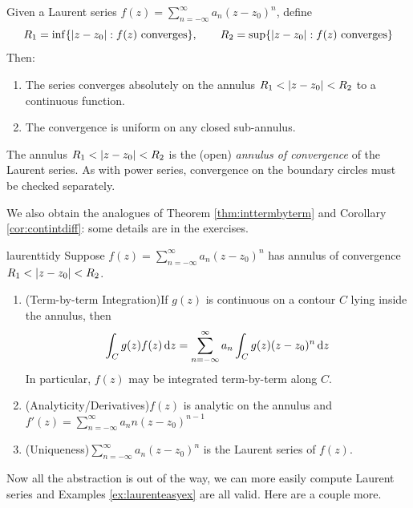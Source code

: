 \begin{cor}{}{}
Given a Laurent series $f(z)=\sum\limits_{n=-\infty}^\infty a_n(z-z_0)^n$, define
\[R_1=\inf\{\left| z-z_0\right|:f(z)\text{ converges}\},\qquad R_2=\sup\{\left| z-z_0\right|:f(z)\text{ converges}\}\]
Then:
\begin{enumerate}
  \item The series converges absolutely on the annulus $R_1<\left| z-z_0\right|<R_2$ to a continuous function.
  \item The convergence is uniform on any closed sub-annulus.
\end{enumerate}
\end{cor}

\begin{defn}{}{}
The annulus $R_1<\left| z-z_0\right|<R_2$ is the (open) \emph{annulus of convergence} of the Laurent series. As with power series, convergence on the boundary circles must be checked separately.
\end{defn}

We also obtain the analogues of Theorem \ref{thm:inttermbyterm} and Corollary \ref{cor:contintdiff}: some details are in the exercises.

\begin{cor}{}{laurenttidy}
Suppose $f(z)=\sum\limits_{n=-\infty}^\infty a_n(z-z_0)^n$ has annulus of convergence $R_1<\left| z-z_0\right|<R_2$.
\begin{enumerate}\itemsep0pt
  \item (Term-by-term Integration)\quad If $g(z)$ is continuous on a contour $C$ lying inside the annulus, then
  \[\int_C g(z)f(z)\,{\mathrm{d} z}=\sum_{n=-\infty}^\infty a_n\int_Cg(z)(z-z_0)^n\,{\mathrm{d} z}\]
  In particular, $f(z)$ may be integrated term-by-term along $C$.
 
 	\item (Analyticity/Derivatives)\quad $f(z)$ is analytic on the annulus and $f'(z)=\sum\limits_{n=-\infty}^\infty a_nn(z-z_0)^{n-1}$
  	
  \item (Uniqueness)\quad $\sum\limits_{n=-\infty}^\infty a_n(z-z_0)^n$ is the Laurent series of $f(z)$.
\end{enumerate}
\end{cor}

Now all the abstraction is out of the way, we can more easily compute Laurent series and Examples \ref{ex:laurenteasyex} are all valid. Here are a couple more.

